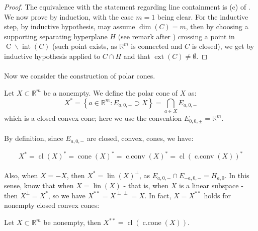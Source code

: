 \begin{proof}
	The equivalence with the statement regarding line containment is (c) of . We now prove by induction, with the case $m=1$ being clear. For the inductive step, by inductive hypothesis, may assume $\dim(C)=m$, then by choosing a supporting separating hyperplane $H$ (see remark after ) crossing a point in $\operatorname{C}\smallsetminus \operatorname{int}(C)$ (such point exists, as $\mathbb{R}^m$ is connected and $C$ is closed), we get by inductive hypothesis applied to $C\cap H$ and  that $\operatorname{ext}(C)\neq\emptyset$.
\end{proof}

\paragraph{}Now we consider the construction of polar cones.

\begin{defn}\label{defn:016-polar-cone}
	Let $X\subset \mathbb{R}^m$ be a nonempty. We define the polar cone of $X$ as:
	\[
		X^\ast=
		\left\{a\in \mathbb{R}^m:E_{a,0,-}\supset X\right\}=
		\bigcap_{a\in X}E_{a,0,-}
	\]
	which is a closed convex cone; here we use the convention $E_{0,0,\pm}=\mathbb{R}^m$.
\end{defn}

\paragraph{}By definition, since $E_{a,0,-}$ are closed, convex, cones, we have:

\[
	X^\ast = \operatorname{cl}(X)^\ast =
	\operatorname{cone}(X)^\ast = \operatorname{c.conv}(X)^\ast = \operatorname{cl}(\operatorname{c.conv}(X))^\ast
\]

\paragraph{}Also, when $X=-X$, then $X^\ast=\operatorname{lin}(X)^\perp$, as $E_{a,0,-}\cap E_{-a,0,-}=H_{a,0}$. In this sense, know that when $X=\operatorname{lin}(X)$ - that is, when $X$ is a linear subspace - then $X^\perp=X^\ast$, so we have $X^{\ast\ast}=X^{\perp\perp}=X$. In fact, $X=X^{\ast\ast}$ holds for nonempty closed convex cones:

\begin{lemm}\label{lemm:016-polar-cone-theorem}
	Let $X\subset \mathbb{R}^m$ be nonempty, then $X^{\ast\ast}=\operatorname{cl}(\operatorname{c.cone}(X))$.
\end{lemm}

